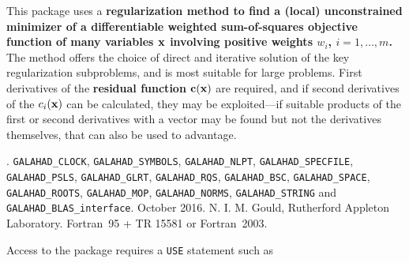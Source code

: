 \documentclass{galahad}
\newcommand{\packagename}{NLS}
\newcommand{\fullpackagename}{\libraryname\_\packagename}
\begin{document}
\galheader


\galsummary
This package uses a {\bf regularization method to find a (local)
unconstrained minimizer of a differentiable weighted sum-of-squares objective
function
of many variables ${\mathbf{x}}$ involving positive weights $w_i$, $i=1,\ldots,m$.}
The method offers the choice of direct and iterative solution of the key
regularization subproblems, and is most suitable for large problems.
First derivatives of the {\bf residual function}
${\mathbf{c}}({\mathbf{x}})$ are required, and if second derivatives of the
$c_i({\mathbf{x}})$ can be calculated, they may be exploited---if suitable products
of the first or second derivatives with a vector may be found but not the
derivatives themselves, that can also be used to advantage.


\galattributes
\galversions{\tt  \fullpackagename\_single, \fullpackagename\_double}.
\galuses
{\tt GALAHAD\_CLOCK},
{\tt GALAHAD\_SY\-M\-BOLS},
{\tt GALAHAD\_NLPT},
{\tt GALAHAD\_SPECFILE},
{\tt GALAHAD\_PSLS},
{\tt GALAHAD\_GLRT},
{\tt GALAHAD\_RQS},
{\tt GALAHAD\_BSC},
{\tt GALAHAD\_\-SPACE},
{\tt GALAHAD\_ROOTS},
{\tt GALAHAD\_MOP},
{\tt GALAHAD\_NORMS},
{\tt GALAHAD\_STRING}
and
{\tt GALAHAD\_BLAS\_interface}.
\galdate October 2016.
\galorigin N. I. M. Gould, Rutherford Appleton Laboratory.
\gallanguage Fortran~95 + TR 15581 or Fortran~2003.


\galhowto


Access to the package requires a {\tt USE} statement such as

\medskip{}
\end{document}
